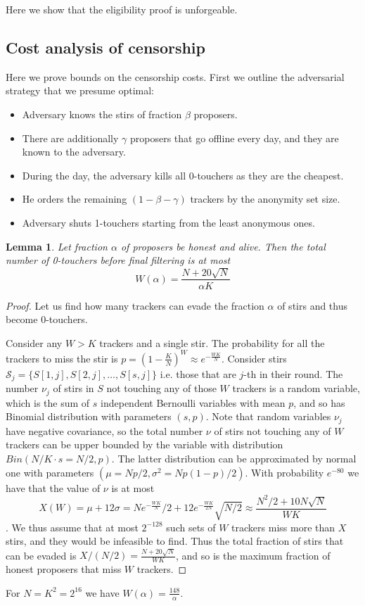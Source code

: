 \documentclass{article}
\newtheorem{lemma}{Lemma}
\begin{document}
Here we show that the eligibility proof is unforgeable.

\subsection{Cost analysis of censorship}


Here we prove bounds on the censorship costs. First we outline the adversarial strategy that we presume optimal:
\begin{itemize}
    \item Adversary knows the stirs of fraction $\beta$ proposers.
    \item There are additionally $\gamma$ proposers that go offline every day, and they are known to the adversary.
    \item During the day, the adversary kills all 0-touchers as they are the cheapest.
    \item He orders the remaining $(1-\beta-\gamma)$ trackers by the anonymity set size. 
    \item Adversary shuts 1-touchers starting from the least anonymous ones.
\end{itemize}

\begin{lemma}
Let fraction $\alpha$ of proposers be honest and alive. Then the total number of 0-touchers before final filtering is at most $$
W(\alpha) =\frac{N+20\sqrt{N}}{\alpha K}
$$
\end{lemma}
\begin{proof} Let us find how many trackers can evade the fraction $\alpha$ of stirs and thus become 0-touchers.

Consider any $W>K$ trackers and a single stir. The probability for all the trackers to miss the stir is $p=(1-\frac{K}{N})^W\approx e^{-\frac{WK}{N}}$. Consider  stirs $\mathcal{S}_j=\{S[1,j],S[2,j],\ldots,S[s,j]\}$ i.e. those  that are $j$-th in their round. The number $\nu_j$ of stirs in $S$ not touching any of those $W$ trackers is a random variable, which is the sum of $s$ independent Bernoulli variables with mean $p$, and so has Binomial distribution with parameters $(s,p)$. Note that random variables $\nu_j$  have negative covariance, so the total number $\nu$ of stirs not touching any of $W$ trackers  can be upper bounded by the variable with distribution $Bin(N/K\cdot s= N/2,p)$. The latter distribution can be approximated by normal one with parameters $(\mu=Np/2,\sigma^2=Np(1-p)/2)$.  With probability $e^{-80}$ we have that  the value of $\nu$ is at most $$
X(W)=\mu+12\sigma = Ne^{-\frac{WK}{N}}/2+12e^{-\frac{WK}{2N}}\sqrt{N/2}\approx \frac{N^2/2+10N\sqrt{N}}{WK}
$$. We thus assume that at most $2^{-128}$ such sets of $W$ trackers miss more than $X$ stirs, and they would be infeasible to find. Thus the total fraction of stirs that can be evaded is $X/(N/2) = \frac{N+20\sqrt{N}}{WK}$, and so is  the maximum fraction of honest proposers that miss $W$ trackers.
\end{proof}
For $N = K^2 = 2^{16}$ we have $W(
\alpha) = \frac{148}{\alpha}$.
\end{document}
